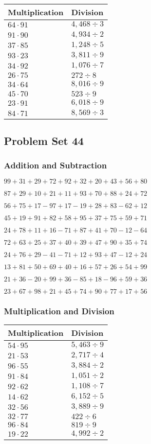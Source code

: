 \begin{longtable}[]{@{}ll@{}}
\toprule
Multiplication & Division\tabularnewline
\midrule
\endhead
\(64\cdot91\) & \(4,468÷3\)\tabularnewline
\(91\cdot90\) & \(4,934÷2\)\tabularnewline
\(37\cdot85\) & \(1,248÷5\)\tabularnewline
\(93\cdot23\) & \(3,811÷9\)\tabularnewline
\(34\cdot92\) & \(1,076÷7\)\tabularnewline
\(26\cdot75\) & \(272÷8\)\tabularnewline
\(34\cdot64\) & \(8,016÷9\)\tabularnewline
\(45\cdot70\) & \(523÷9\)\tabularnewline
\(23\cdot91\) & \(6,018÷9\)\tabularnewline
\(84\cdot71\) & \(8,569÷3\)\tabularnewline
\bottomrule
\end{longtable}

\hypertarget{problem-set-44}{%
\subsection{Problem Set 44}\label{problem-set-44}}

\hypertarget{addition-and-subtraction-84}{%
\subsubsection{Addition and
Subtraction}\label{addition-and-subtraction-84}}

\(99+31+29+72+92+32+20+43+56+ 80\)

\(87+29+10+21+11+93+70+88+24+72\)

\(56+75+17-97+17-19+28+83-62+12\)

\(45+19+91+82+58+95+37+75+59+71\)

\(24+78+11+16-71+87+41+70-12-64\)

\(72+63+25+37+40+39+47+90+35+74\)

\(24+76+29-41-71+12+93+47-12+24\)

\(13+81+50+69+40+16+57+26+54+99\)

\(21+36-20+99+36-85+18-96+59+36\)

\(23+67+98+21+45+74+90+77+17+56\)

\hypertarget{multiplication-and-division-84}{%
\subsubsection{Multiplication and
Division}\label{multiplication-and-division-84}}

\begin{longtable}[]{@{}ll@{}}
\toprule
Multiplication & Division\tabularnewline
\midrule
\endhead
\(54\cdot95\) & \(5,463÷9\)\tabularnewline
\(21\cdot53\) & \(2,717÷4\)\tabularnewline
\(96\cdot55\) & \(3,884÷2\)\tabularnewline
\(91\cdot84\) & \(1,051÷2\)\tabularnewline
\(92\cdot62\) & \(1,108÷7\)\tabularnewline
\(14\cdot62\) & \(6,152÷5\)\tabularnewline
\(32\cdot56\) & \(3,889÷9\)\tabularnewline
\(32\cdot77\) & \(422÷6\)\tabularnewline
\(96\cdot84\) & \(819÷9\)\tabularnewline
\(19\cdot22\) & \(4,992÷2\)\tabularnewline
\bottomrule
\end{longtable}

